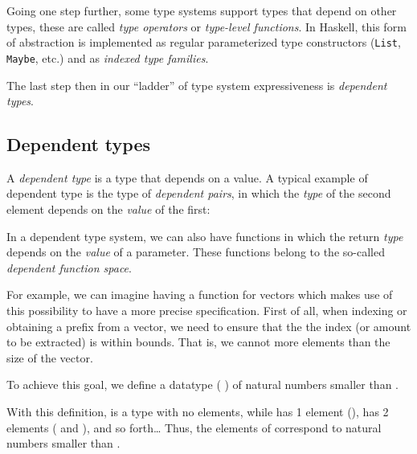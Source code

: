             Going one step further, some type systems support types that depend on other types, these are
            called \emph{type operators} or \emph{type-level functions}.
            In Haskell, this form of abstraction is implemented as regular parameterized type constructors
            (\texttt{List}, \texttt{Maybe}, etc.) and as \emph{indexed type families}.

            The last step then in our ``ladder'' of type system expressiveness is \emph{dependent types}.

        \subsection{Dependent types}
        \label{subsec:dependent-types}

            A \emph{dependent type} is a type that depends on a value.
            A typical example of dependent type is the type of \emph{dependent pairs},
            in which the \emph{type} of the second element depends on the \emph{value} of the first:
            \begin{listing}[h]
            \end{listing}

            In a dependent type system, we can also have functions in which the return \emph{type}
            depends on the \emph{value} of a parameter.
            These functions belong to the so-called \emph{dependent function space}.

            For example, we can imagine having a  function for vectors which makes use
            of this possibility to have a more precise specification.
            First of all, when indexing or obtaining a prefix from a vector,
            we need to ensure that the the index (or amount to be extracted) is within bounds.
            That is, we cannot  more elements than the size of the vector.

            To achieve this goal, we define a datatype ( ) of natural numbers smaller than .
            \begin{listing}[h]
            \end{listing}

            With this definition,   is a type with no elements,
            while   has 1 element (),
              has 2 elements ( and  ), and so forth\ldots
            Thus, the elements of   correspond to natural numbers smaller than .

